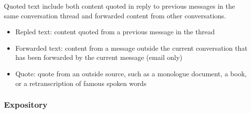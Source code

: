 \documentclass[11pt]{article}
\begin{document}
Quoted text include both content quoted in reply to previous messages in the same conversation thread and forwarded content from other conversations.

\begin{itemize}
	\item Repled text: content quoted from a previous message in the thread
	\item Forwarded text: content from a message outside the current conversation that has been forwarded by the current message (email only)
	\item Quote: quote from an outside source, such as a monologue document, a book, or a retranscription of famous spoken words
\end{itemize}

\subsubsection{Expository}
\end{document}

